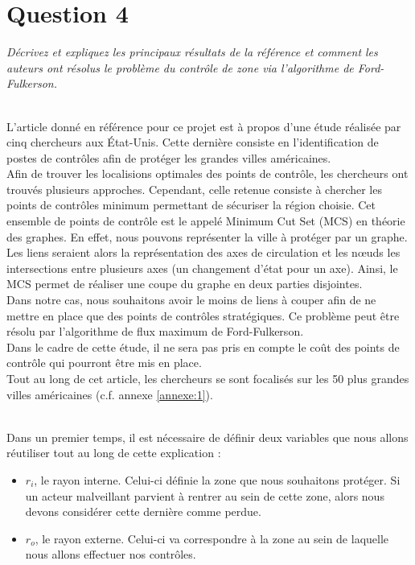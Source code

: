 \section{Question 4}
\textit{Décrivez et expliquez les principaux résultats de la référence \cite{tiquette} et comment les auteurs ont résolus le problème du contrôle de zone via l'algorithme de Ford-Fulkerson.}\\~\\\par
L'article donné en référence pour ce projet est à propos d'une étude réalisée par cinq chercheurs aux État-Unis. Cette dernière consiste en l'identification de postes de contrôles afin de protéger les grandes villes américaines.\\
Afin de trouver les localisions optimales des points de contrôle, les chercheurs ont trouvés plusieurs approches. Cependant, celle retenue consiste à chercher les points de contrôles minimum permettant de sécuriser la région choisie. Cet ensemble de points de contrôle est le appelé Minimum Cut Set (MCS) en théorie des graphes. En effet, nous pouvons représenter la ville à protéger par un graphe. Les liens seraient alors la représentation des axes de circulation et les nœuds les intersections entre plusieurs axes (un changement d'état pour un axe). Ainsi, le MCS permet de réaliser une coupe du graphe en deux parties disjointes.\\
Dans notre cas, nous souhaitons avoir le moins de liens à couper afin de ne mettre en place que des points de contrôles stratégiques. Ce problème peut être résolu par l'algorithme de flux maximum de Ford-Fulkerson.\\
Dans le cadre de cette étude, il ne sera pas pris en compte le coût des points de contrôle qui pourront être mis en place.\\
Tout au long de cet article, les chercheurs se sont focalisés sur les 50 plus grandes villes américaines (c.f. annexe \ref{annexe:1}).\\~\\\par
Dans un premier temps, il est nécessaire de définir deux variables que nous allons réutiliser tout au long de cette explication :
\begin{itemize}
 \item $r_i$, le rayon interne. Celui-ci définie la zone que nous souhaitons protéger. Si un acteur malveillant parvient à rentrer au sein de cette zone, alors nous devons considérer cette dernière comme perdue.
 \item $r_o$, le rayon externe. Celui-ci va correspondre à la zone au sein de laquelle nous allons effectuer nos contrôles.
\end{itemize}
